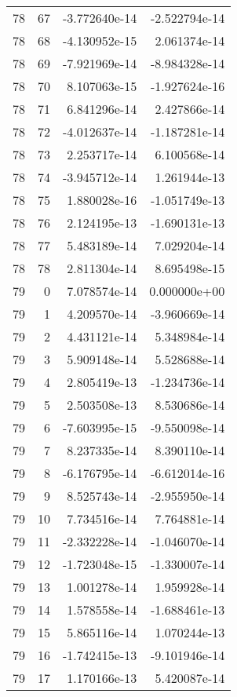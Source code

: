 \begin{tabular}{rrrr}
  78 &   67 & -3.772640e-14 & -2.522794e-14 \\
  78 &   68 & -4.130952e-15 &  2.061374e-14 \\
  78 &   69 & -7.921969e-14 & -8.984328e-14 \\
  78 &   70 &  8.107063e-15 & -1.927624e-16 \\
  78 &   71 &  6.841296e-14 &  2.427866e-14 \\
  78 &   72 & -4.012637e-14 & -1.187281e-14 \\
  78 &   73 &  2.253717e-14 &  6.100568e-14 \\
  78 &   74 & -3.945712e-14 &  1.261944e-13 \\
  78 &   75 &  1.880028e-16 & -1.051749e-13 \\
  78 &   76 &  2.124195e-13 & -1.690131e-13 \\
  78 &   77 &  5.483189e-14 &  7.029204e-14 \\
  78 &   78 &  2.811304e-14 &  8.695498e-15 \\
  79 &    0 &  7.078574e-14 &  0.000000e+00 \\
  79 &    1 &  4.209570e-14 & -3.960669e-14 \\
  79 &    2 &  4.431121e-14 &  5.348984e-14 \\
  79 &    3 &  5.909148e-14 &  5.528688e-14 \\
  79 &    4 &  2.805419e-13 & -1.234736e-14 \\
  79 &    5 &  2.503508e-13 &  8.530686e-14 \\
  79 &    6 & -7.603995e-15 & -9.550098e-14 \\
  79 &    7 &  8.237335e-14 &  8.390110e-14 \\
  79 &    8 & -6.176795e-14 & -6.612014e-16 \\
  79 &    9 &  8.525743e-14 & -2.955950e-14 \\
  79 &   10 &  7.734516e-14 &  7.764881e-14 \\
  79 &   11 & -2.332228e-14 & -1.046070e-14 \\
  79 &   12 & -1.723048e-15 & -1.330007e-14 \\
  79 &   13 &  1.001278e-14 &  1.959928e-14 \\
  79 &   14 &  1.578558e-14 & -1.688461e-13 \\
  79 &   15 &  5.865116e-14 &  1.070244e-13 \\
  79 &   16 & -1.742415e-13 & -9.101946e-14 \\
  79 &   17 &  1.170166e-13 &  5.420087e-14 \\

\end{tabular}
